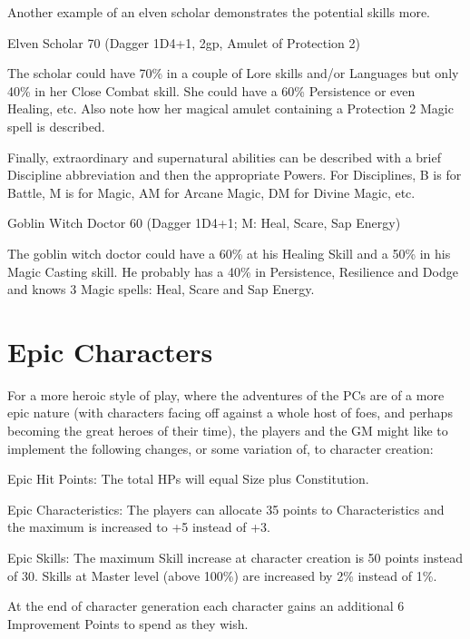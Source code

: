 Another example of an elven scholar demonstrates the potential skills more.

\vspace{1em}
\begin{rpg-examplebox}
Elven Scholar 70 (Dagger 1D4+1, 2gp, Amulet of Protection 2)
\end{rpg-examplebox}
\vspace{1em}

The scholar could have 70\% in a couple of Lore skills and/or Languages but only 40\% in her Close Combat skill. She could have a 60\% Persistence or even Healing, etc.
Also note how her magical amulet containing a Protection 2 Magic spell is described.

Finally, extraordinary and supernatural abilities can be described with a brief Discipline abbreviation and then the appropriate Powers. For Disciplines, B is for Battle, M is for Magic, AM for Arcane Magic, DM for Divine Magic, etc.

\vspace{1em}
\begin{rpg-examplebox}
Goblin Witch Doctor 60 (Dagger 1D4+1; M: Heal, Scare, Sap Energy)
\end{rpg-examplebox}
\vspace{1em}

The goblin witch doctor could have a 60\% at his Healing Skill and a 50\% in his Magic Casting skill. He probably has a 40\% in Persistence, Resilience and Dodge and knows 3 Magic spells: Heal, Scare and Sap Energy.


\section{Epic Characters}
For a more heroic style of play, where the adventures of the PCs are of a more epic nature (with characters facing off against a whole host of foes, and perhaps becoming the great heroes of their time), the players and the GM might like to implement the following changes, or some variation of, to character creation:

\begin{rpg-list}
	\item Epic Hit Points: The total HPs will equal Size plus Constitution.
	\item Epic Characteristics: The players can allocate 35 points to Characteristics and the maximum is increased to +5 instead of +3.
	\item Epic Skills: The maximum Skill increase at character creation is 50 points instead of 30. Skills at Master level (above 100\%) are increased by 2\% instead of 1\%.
	\item At the end of character generation each character gains an additional 6 Improvement Points to spend as they wish.
\end{rpg-list}

